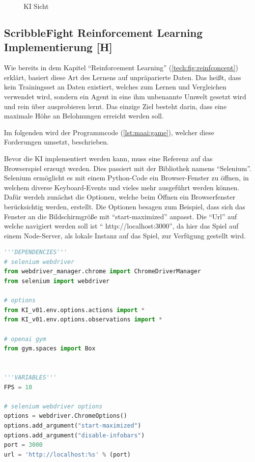 \begin{figure}[H]
\begin{minipage}[t]{0.45\linewidth}
        \caption{KI Sicht}
        \label{maai:ai:visCopy:output}
    \end{minipage}
\end{figure}

\subsection{ScribbleFight Reinforcement Learning Implementierung [H]}
Wie bereits in dem Kapitel ``Reinforcement Learning'' (\ref{tech:fig:reinfconcept}) erklärt, basiert diese Art des Lernens auf unpräparierte Daten. Das heißt, dass kein Trainingsset an Daten existiert, welches zum Lernen und Vergleichen verwendet wird, sondern ein Agent in eine ihm unbenannte Umwelt gesetzt wird und rein über ausprobieren lernt. Das einzige Ziel besteht darin, dass eine maximale Höhe an Belohnungen erreicht werden soll.

Im folgenden wird der Programmcode (\ref{lst:maai:game}), welcher diese Forderungen umsetzt, beschrieben.

Bevor die KI implementiert werden kann, muss eine Referenz auf das Browserspiel erzeugt werden. Dies passiert mit der Bibliothek namens ``Selenium''. Selenium ermöglicht es mit einem Python-Code ein Browser-Fenster zu öffnen, in welchem diverse Keyboard-Events und vieles mehr ausgeführt werden können. Dafür werdeh zunächst die Optionen, welche beim Öffnen ein Browserfenster berücksichtig werden, erstellt. Die Optionen besagen zum Beispiel, dass sich das Fenster an die Bildschirmgröße mit ``start-maximized'' anpasst. Die ``Url'' auf welche navigiert werden soll ist `` http://localhost:3000'', da hier das Spiel auf einem Node-Server, als lokale Instanz auf das Spiel, zur Verfügung gestellt wird.

\begin{lstlisting}[language=Python,label=lst:maai:game,caption=Implementation der Logik der Reinforcement Learning KI]
'''DEPENDENCIES'''
# selenium webdriver
from webdriver_manager.chrome import ChromeDriverManager
from selenium import webdriver

# options
from KI_v01.env.options.actions import *
from KI_v01.env.options.observations import *

# openai gym
from gym.spaces import Box


'''VARIABLES'''
FPS = 10

# selenium webdriver options
options = webdriver.ChromeOptions()
options.add_argument("start-maximized")
options.add_argument("disable-infobars")
port = 3000
url = 'http://localhost:%s' % (port)

\end{lstlisting}


